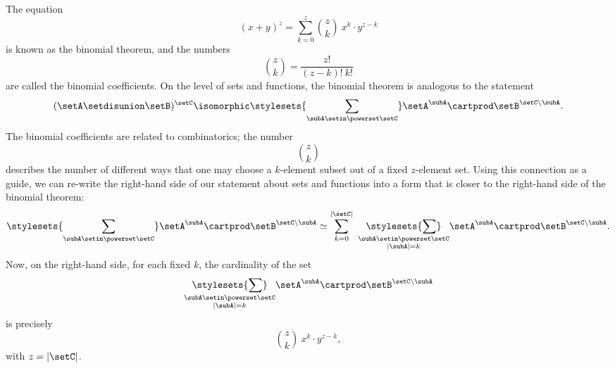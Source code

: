 The equation 
\begin{equation}
(x + y)^z = \sum_{k = 0}^z {{z}\choose{k}} \ x^k \cdot y^{z - k}
\end{equation}
is known as the binomial theorem, and the numbers
\begin{equation}
{{z}\choose{k}} = \frac{z!}{(z-k)! \ k!}
\end{equation}
are called the binomial coefficients. On the level of sets and functions, the binomial theorem is analogous to the statement
\begin{equation}
(\setA \setdisunion \setB)^{\setC}  \isomorphic \stylesets{\sum_{\subA \setin \powerset \setC}} \setA^\subA \cartprod \setB^{\setC \backslash \subA}.
\end{equation}
The binomial coefficients are related to combinatorics; the number
\begin{equation}
{{z}\choose{k}}
\end{equation}
describes the number of different ways that one may choose a $k$-element subset out of a fixed $z$-element set. Using this connection as a guide, we can re-write the right-hand side of our statement about sets and functions into a form that is closer to the right-hand side of the binomial theorem: 
\begin{equation}
\stylesets{\sum_{\subA \setin \powerset \setC}} \setA^\subA \cartprod \setB^{\setC \backslash \subA} \simeq \sum_{k = 0}^{\vert \setC \vert} \ \underset{\substack{\subA \setin \powerset \setC \\ \vert \subA \vert = k}}{\stylesets{\sum}} \setA^\subA \cartprod \setB^{\setC \backslash \subA}.
\end{equation}
Now, on the right-hand side, for each fixed $k$, the cardinality of the set 
\begin{equation}
\underset{\substack{\subA \setin \powerset \setC \\ \vert \subA \vert = k}}{\stylesets{\sum}} \setA^\subA \cartprod \setB^{\setC \backslash \subA}
\end{equation}
is precisely 
\begin{equation}
{{z}\choose{k}} \ x^k \cdot y^{z - k},
\end{equation}
with $z = \vert \setC \vert$. 

